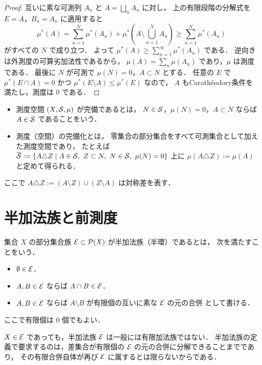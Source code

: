 \begin{proof}
互いに素な可測列 $A_n$ と $A=\bigsqcup_n A_n$ に対し，
上の有限段階の分解式を $E=A$，$B_n=A_n$ に適用すると
\[
\mu^*(A)
=
\sum_{n=1}^{N}\mu^*(A_n)
+
\mu^*\left(A\setminus\bigcup_{n=1}^{N}A_n\right)
\ge
\sum_{n=1}^{N}\mu^*(A_n)
\]
がすべての $N$ で成り立つ．
よって $\mu^*(A)\ge\sum_{n=1}^{\infty}\mu^*(A_n)$ である．
逆向きは外測度の可算劣加法性であるから，
$\mu(A)=\sum_n\mu(A_n)$ であり，$\mu$ は測度である．
最後に $N$ が可測で $\mu(N)=0$，$A\subset N$ とする．
任意の $E$ で $\mu^*(E\cap A)=0$ かつ $\mu^*(E\setminus A)\le\mu^*(E)$ なので，
$A$ もCarathéodory条件を満たし，測度は $0$ である．
\end{proof}

\begin{definition}[完備測度と完備化]\label{def:completion}
\begin{itemize}
    \item
    測度空間 $(X,\mathcal S,\mu)$ が完備であるとは，
    $N\in\mathcal S$，$\mu(N)=0$，$A\subset N$ ならば $A\in\mathcal S$ であることをいう．
    \item
    測度（空間）の完備化とは，
    零集合の部分集合をすべて可測集合として加えた測度空間であり，
    たとえば
    $\overline{\mathcal S}:=\{A\triangle Z\mid A\in\mathcal S,\ Z\subset N,\ N\in\mathcal S,\ \mu(N)=0\}$
    上に $\overline\mu(A\triangle Z):=\mu(A)$ と定めて得られる．
\end{itemize}
ここで $A\triangle Z:=(A\setminus Z)\cup(Z\setminus A)$ は対称差を表す．
\end{definition}

\section{半加法族と前測度}

\begin{definition}[半加法族]\label{def:semiring}
集合 $X$ の部分集合族 $\mathcal E\subset\mathcal P(X)$ が半加法族（半環）であるとは，
次を満たすことをいう．
\begin{itemize}
    \item $\emptyset\in\mathcal E$．
    \item $A,B\in\mathcal E$ ならば $A\cap B\in\mathcal E$．
    \item $A,B\in\mathcal E$ ならば $A\setminus B$ が有限個の互いに素な $\mathcal E$ の元の合併
    として書ける．
\end{itemize}
ここで有限個は $0$ 個でもよい．
\end{definition}

\begin{remark}
$X\in\mathcal E$ であっても，半加法族 $\mathcal E$ は一般には有限加法族ではない．
半加法族の定義で要求するのは，差集合が有限個の $\mathcal E$ の元の合併に分解できることまでであり，
その有限合併自体が再び $\mathcal E$ に属するとは限らないからである．
\end{remark}

